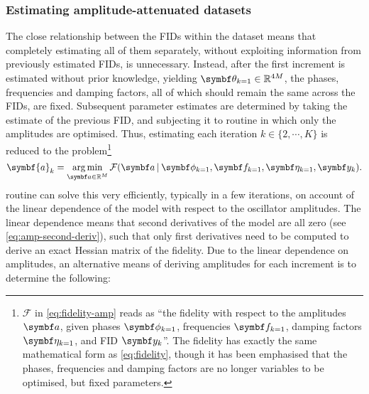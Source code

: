 \subsubsection{Estimating amplitude-attenuated datasets}
The close relationship between the \acp{FID} within the dataset means that
completely estimating all of them separately, without exploiting information
from previously estimated \acp{FID}, is unnecessary.
Instead, after the first increment is estimated without prior knowledge,
yielding $\bth_{k=1} \in \mathbb{R}^{4M}$, the phases, frequencies and damping
factors, all of which should remain the same across the
\acp{FID}, are fixed.
Subsequent parameter estimates are determined by taking the estimate
of the previous \ac{FID}, and subjecting it to  routine in which only
the amplitudes are optimised. Thus, estimating
each iteration $k \in \lbrace2, \cdots, K\rbrace$ is reduced to the
problem\footnote{
    $\mathcal{F}$ in \cref{eq:fidelity-amp} reads as ``the fidelity
    with respect to the amplitudes $\bda$, given phases $\bdphi_{k=1}$,
    frequencies $\bdf_{k=1}$, damping factors  $\bdeta_{k=1}$, and \ac{FID}
    $\by_k$''. The fidelity has exactly the same mathematical form as
    \cref{eq:fidelity}, though it has been emphasised that the phases,
    frequencies and damping factors are no longer variables to be optimised,
    but fixed parameters.
}
\begin{equation}
    \symbf{a}_k = \argmin_{\bda \in \mathbb{R}^M}
        \mathcal{F}(\bda \hspace*{2pt} | \hspace*{2pt}
        \bdphi_{k=1}, \bdf_{k=1}, \bdeta_{k=1}, \by_k).
        \label{eq:fidelity-amp}
\end{equation}
 routine can solve this very efficiently, typically in a few
iterations, on account of the linear dependence of the model with respect to
the oscillator amplitudes. The linear dependence means that second
derivatives of the model are all zero (see \cref{eq:amp-second-deriv}),
such that only first derivatives need to be computed to derive an exact Hessian
matrix of the fidelity.
Due to the linear dependence on amplitudes, an alternative means of
deriving amplitudes for each increment is to determine the following:
